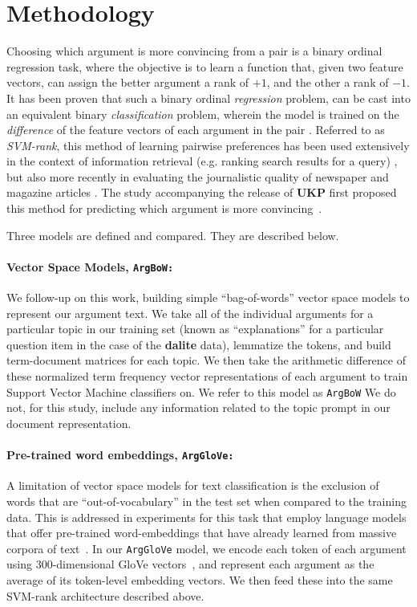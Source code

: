 \documentclass[runningheads]{llncs}
\begin{document}
\section{Methodology}

Choosing which argument is more convincing from a pair is a binary 
ordinal regression task, where the objective is to learn a function that, given 
two feature vectors, can assign the better argument a rank of $+1$, and the 
other a rank of $-1$.   
It has been proven that such a binary ordinal \textit{regression} problem, can 
be cast into an equivalent binary \textit{classification} problem, wherein the 
model is trained on the \textit{difference} of the feature vectors of each 
argument in the pair \cite{herbrich_support_1999}. 
Referred to as \textit{SVM-rank}, this method of learning pairwise preferences 
has been used extensively in the context of information retrieval (e.g. ranking 
search results for a query) 
\cite{joachims_optimizing_2002}, but also more recently in evaluating the 
journalistic quality of newspaper and magazine articles \cite{louis_what_2013}.
The study accompanying the release of \textbf{UKP} first proposed this method 
for predicting which argument is more convincing~\cite{habernal_which_2016}.

Three models are defined and compared.  They are described below.

\paragraph{\textbf{Vector Space Models, \tt{ArgBoW}:}}

We follow-up on this work, building simple ``bag-of-words'' vector space models 
to represent our argument text. 
We take all of the individual arguments for a particular topic in our training 
set (known as  ``explanations'' for a particular question item in the case of 
the \textbf{dalite} data), lemmatize the tokens, and build term-document 
matrices for each topic.
We then take the arithmetic difference of these normalized term frequency 
vector representations of each argument to train Support Vector Machine 
classifiers on. 
We refer to this model as \verb|ArgBoW| 
We do not, for this study, include any information related to the topic prompt 
in our document representation.


\paragraph{\textbf{Pre-trained word embeddings, \tt{ArgGloVe}:}}
A limitation of vector space models for text classification is the exclusion of 
words that are ``out-of-vocabulary'' in the test set when compared to the 
training data.
This is addressed in experiments for this task that employ language models that 
offer pre-trained word-embeddings that have already learned from massive 
corpora of text~\cite{habernal_which_2016}\cite{gleize_are_2019}.    
In our \verb|ArgGloVe| model, we encode each token of each argument using 
300-dimensional GloVe vectors~\cite{pennington_glove:_2014}, 
and represent each argument as the average of its token-level embedding 
vectors. 
We then feed these into the same SVM-rank architecture described above. 
\end{document}

